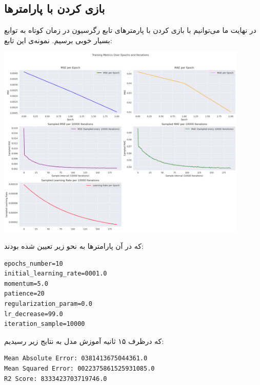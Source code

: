 \documentclass[11pt, a4paper, oneside]{book}
\begin{document}
\subsection{بازی کردن با پارامترها}
در نهایت ما می‌توانیم با بازی کردن با پارمترهای تابع رگرسیون در زمان کوتاه به توابع بسیار خوبی برسیم. نمونه‌ی این تابع:
\begin{center}
	\includegraphics[width=12cm]{./images/train2.png}
\end{center}
که در آن پارامترها به نحو زیر تعیین شده بودند:
\begin{LTR}
	\begin{verbatim}
epochs_number=10
initial_learning_rate=0001.0
momentum=5.0
patience=20
regularization_param=0.0
lr_decrease=99.0
iteration_sample=10000
	\end{verbatim}
\end{LTR}

که درظرف ۱۵ ثانیه آموزش مدل به نتایج زیر رسیدیم:
\begin{LTR}
	\begin{verbatim}
Mean Absolute Error: 0381413675044361.0
Mean Squared Error: 0022375861525931085.0
R2 Score: 8333423703719746.0
	\end{verbatim}
\end{LTR}
\end{document}
